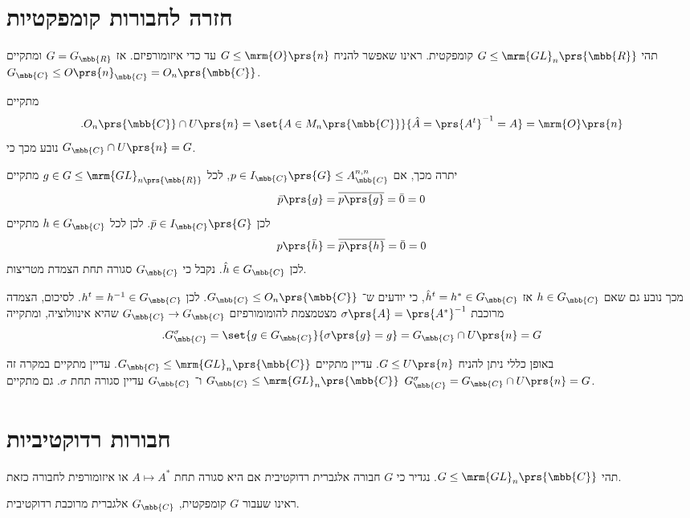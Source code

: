 \documentclass[10pt, twoside]{book}
\begin{document}
\section{חזרה לחבורות קומפקטיות}

תהי
$G \leq \mrm{GL}_n\prs{\mbb{R}}$
קומפקטית.
ראינו שאפשר להניח
$G \leq \mrm{O}\prs{n}$
עד כדי איזומורפיזם.
אז
$G = G_{\mbb{R}}$
ומתקיים
$G_{\mbb{C}} \leq O\prs{n}_{\mbb{C}} = O_n\prs{\mbb{C}}$.

מתקיים
\[\text{.} O_n\prs{\mbb{C}} \cap U\prs{n} = \set{A \in M_n\prs{\mbb{C}}}{\hat{A} = \prs{A^t}^{-1} = A} = \mrm{O}\prs{n}\]
נובע מכך כי
$G_{\mbb{C}} \cap U\prs{n} = G$.

יתרה מכך, אם
$p \in I_{\mbb{C}}\prs{G} \leq A_{\mbb{C}}^{n,n}$,
לכל
$g \in G \leq \mrm{GL}_{n\prs{\mbb{R}}}$
מתקיים
\[\bar{p}\prs{g} = \overline{p\prs{g}} = \bar{0} = 0\]
לכן
$\bar{p} \in I_{\mbb{C}}\prs{G}$.
לכן לכל
$h \in G_{\mbb{C}}$
מתקיים
\[p\prs{\bar{h}} = \overline{\bar{p}\prs{h}} = \bar{0} = 0\]
לכן
$\hat{h} \in G_{\mbb{C}}$.
נקבל כי
$G_{\mbb{C}}$
סגורה תחת הצמדת מטריצות.

מכך נובע גם שאם
$h \in G_{\mbb{C}}$
אז
$\hat{h}^t = h^* \in G_{\mbb{C}}$,
כי יודעים ש־%
$G_{\mbb{C}} \leq O_n\prs{\mbb{C}}$.
לכן
$h^t = h^{-1} \in G_{\mbb{C}}$.
לסיכום, הצמדה מרוכבת
$\sigma\prs{A} = \prs{A^*}^{-1}$
מצטמצמת להומומורפיזם
$G_{\mbb{C}} \to G_{\mbb{C}}$
שהיא אינוולוציה, ומתקייה
\[\text{.} G_{\mbb{C}}^\sigma = \set{g \in G_{\mbb{C}}}{\sigma\prs{g} = g} = G_{\mbb{C}} \cap U\prs{n} = G\]

\begin{remark}
באופן כללי ניתן להניח
$G \leq U\prs{n}$.
עדיין מתקיים
$G_{\mbb{C}} \leq \mrm{GL}_n\prs{\mbb{C}}$.
עדיין מתקיים במקרה זה
$G_{\mbb{C}} \leq \mrm{GL}_n\prs{\mbb{C}}$
ו־%
$G_{\mbb{C}}$
עדיין סגורה תחת
$\sigma$.
גם מתקיים
$G^\sigma_{\mbb{C}} = G_{\mbb{C}} \cap U\prs{n} = G$.
\end{remark}

\section{חבורות רדוקטיביות}

\begin{definition}
תהי
$G \leq \mrm{GL}_n\prs{\mbb{C}}$.
נגדיר כי
$G$
חבורה אלגברית רדוקטיבית אם היא סגורה תחת
$A \mapsto A^*$
או איזומורפית לחבורה כזאת.
\end{definition}

ראינו שעבור
$G$
קומפקטית,
$G_{\mbb{C}}$
אלגברית מרוכבת רדוקטיבית.
\end{document}

